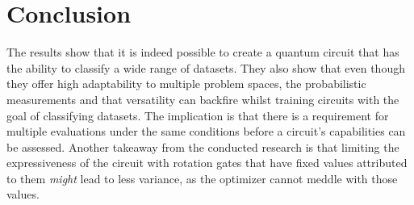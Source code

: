 \section{Conclusion}
The results show that it is indeed possible to create a quantum circuit that has the ability to classify a wide range of datasets. They also show that even though they offer high adaptability to multiple problem spaces, the probabilistic measurements and that versatility can backfire whilst training circuits with the goal of classifying datasets. The implication is that there is a requirement for multiple evaluations under the same conditions before a circuit's capabilities can be assessed. Another takeaway from the conducted research is that limiting the expressiveness of the circuit with rotation gates that have fixed values attributed to them \emph{might} lead to less variance, as the optimizer cannot meddle with those values.



